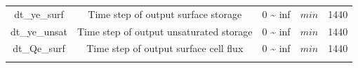 \documentclass[]{scrbook}
\begin{document}
\begin{longtable}[]{@{}ccccc@{}}
\begin{minipage}[t]{0.17\columnwidth}
dt\_ye\_surf\strut
\end{minipage} & \begin{minipage}[t]{0.23\columnwidth}\centering\strut
Time step of output surface storage\strut
\end{minipage} & \begin{minipage}[t]{0.10\columnwidth}\centering\strut
0 \textasciitilde{} inf\strut
\end{minipage} & \begin{minipage}[t]{0.10\columnwidth}\centering\strut
\(min\)\strut
\end{minipage} & \begin{minipage}[t]{0.26\columnwidth}\centering\strut
1440\strut
\end{minipage}\tabularnewline
\begin{minipage}[t]{0.17\columnwidth}\centering\strut
dt\_ye\_unsat\strut
\end{minipage} & \begin{minipage}[t]{0.23\columnwidth}\centering\strut
Time step of output unsaturated storage\strut
\end{minipage} & \begin{minipage}[t]{0.10\columnwidth}\centering\strut
0 \textasciitilde{} inf\strut
\end{minipage} & \begin{minipage}[t]{0.10\columnwidth}\centering\strut
\(min\)\strut
\end{minipage} & \begin{minipage}[t]{0.26\columnwidth}\centering\strut
1440\strut
\end{minipage}\tabularnewline
\begin{minipage}[t]{0.17\columnwidth}\centering\strut
dt\_Qe\_surf\strut
\end{minipage} & \begin{minipage}[t]{0.23\columnwidth}\centering\strut
Time step of output surface cell flux\strut
\end{minipage} & \begin{minipage}[t]{0.10\columnwidth}\centering\strut
0 \textasciitilde{} inf\strut
\end{minipage} & \begin{minipage}[t]{0.10\columnwidth}\centering\strut
\(min\)\strut
\end{minipage} & \begin{minipage}[t]{0.26\columnwidth}\centering\strut
1440\strut
\end{minipage}\tabularnewline
\begin{minipage}[t]{0.17\columnwidth}\centering\strut

\end{minipage}
\end{longtable}
\end{document}
